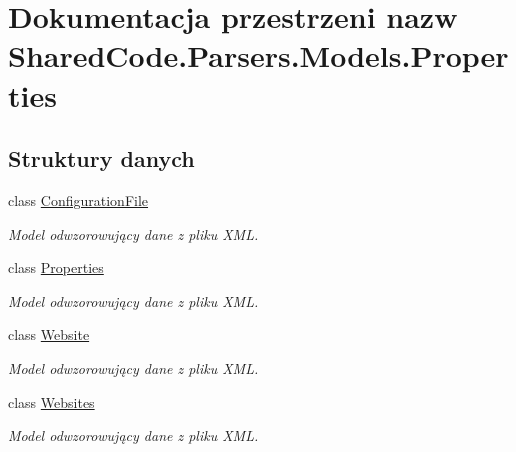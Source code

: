\hypertarget{a00315}{}\section{Dokumentacja przestrzeni nazw Shared\+Code.\+Parsers.\+Models.\+Properties}
\label{a00315}
\subsection*{Struktury danych}
\begin{DoxyCompactItemize}
\item 
class \hyperlink{a00012}{Configuration\+File}
\begin{DoxyCompactList}\small\item\em Model odwzorowujący dane z pliku X\+M\+L. \end{DoxyCompactList}\item 
class \hyperlink{a00042}{Properties}
\begin{DoxyCompactList}\small\item\em Model odwzorowujący dane z pliku X\+M\+L. \end{DoxyCompactList}\item 
class \hyperlink{a00086}{Website}
\begin{DoxyCompactList}\small\item\em Model odwzorowujący dane z pliku X\+M\+L. \end{DoxyCompactList}\item 
class \hyperlink{a00087}{Websites}
\begin{DoxyCompactList}\small\item\em Model odwzorowujący dane z pliku X\+M\+L. \end{DoxyCompactList}\end{DoxyCompactItemize}

